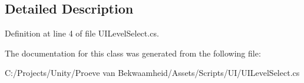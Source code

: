 \subsection{Detailed Description}


Definition at line 4 of file U\+I\+Level\+Select.\+cs.



The documentation for this class was generated from the following file\+:\begin{DoxyCompactItemize}
\item 
C\+:/\+Projects/\+Unity/\+Proeve van Bekwaamheid/\+Assets/\+Scripts/\+U\+I/U\+I\+Level\+Select.\+cs\end{DoxyCompactItemize}
